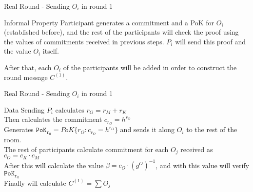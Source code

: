\begin{frame}{Real Round - Sending $O_i$ in round 1}
    \begin{block}{Informal Property}
        Participant generates a commitment and a PoK for $O_i$ (established before), and the rest of the participants will check the proof using the values of commitments received in previous steps. $P_i$ will send this proof and the value $O_i$ itself.
        
        After that, each $O_i$ of the participants will be added in order to construct the round message $C^{(1)}$.
    \end{block}
\end{frame}

\begin{frame}{Real Round - Sending $O_i$ in round 1}
    \begin{block}{Data Sending}
        $P_i$ calculates $r_{O} = r_{M} + r_{K}$\\
        Then calculates the commitment $c_{r_O} = h^{r_O}$\\
        Generates $\mathtt{PoK_{r_O}} = PoK\{r_O:c_{r_O} = h^{r_O}\}$ and sends it along $O_i$ to the rest of the room.\\
        The rest of participants calculate commitment for each $O_j$ received as $c_O = c_K \cdot c_M$\\
        After this will calculate the value $\beta = c_O \cdot (g^O)^{-1}$, and with this value will verify $\mathtt{PoK_{r_O}}$\\
        Finally will calculate $C^{(1)} = \sum O_j$
    \end{block}
\end{frame}